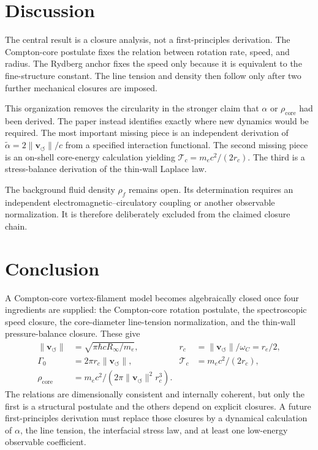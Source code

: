 \documentclass[aps,pra,preprint,longbibliography,nofootinbib]{revtex4-2}
\newcommand{\vnorm}{\lVert\mathbf{v}_{\!\boldsymbol{\circlearrowleft}}\rVert} %
\newcommand{\rhof}{\rho_{\!f}}                   %
\newcommand{\rhocore}{\rho_{\mathrm{core}}}      %
\newcommand{\rc}{r_c}                            %
\newcommand{\Tc}{\mathcal{T}_c}                  %
\newcommand{\Gz}{\Gamma_0}                       %
\begin{document}
\section{Discussion}
\label{sec:discussion}

The central result is a closure analysis, not a first-principles
derivation.  The Compton-core postulate fixes the relation between
rotation rate, speed, and radius.  The Rydberg anchor fixes the speed
only because it is equivalent to the fine-structure constant.  The line
tension and density then follow only after two further mechanical
closures are imposed.

This organization removes the circularity in the stronger claim that
$\alpha$ or $\rho_{\mathrm{core}}$ had been derived.  The paper instead
identifies exactly where new dynamics would be required.  The most
important missing piece is an independent derivation of
$\tilde\alpha=2\vnorm/c$ from a specified interaction functional.  The
second missing piece is an on-shell core-energy calculation yielding
$\mathcal{T}_c=m_ec^2/(2r_c)$.  The third is a stress-balance derivation
of the thin-wall Laplace law.

The background fluid density $\rhof$ remains open.  Its determination
requires an independent electromagnetic--circulatory coupling or another
observable normalization.  It is therefore deliberately excluded from
the claimed closure chain.

\section{Conclusion}
\label{sec:conclusion}

A Compton-core vortex-filament model becomes algebraically closed once
four ingredients are supplied: the Compton-core rotation postulate, the
spectroscopic speed closure, the core-diameter line-tension
normalization, and the thin-wall pressure-balance closure.  These give
\begin{align*}
  \vnorm  &= \sqrt{\pi\hbar cR_\infty/m_e},
  &\rc    &= \vnorm/\omega_C = r_e/2, \\
  \Gz     &= 2\pi\rc\vnorm,
  &\Tc    &= m_ec^2/(2\rc),\\
  \rhocore &= m_ec^2/(2\pi\vnorm^2\rc^3).
\end{align*}
The relations are dimensionally consistent and internally coherent, but
only the first is a structural postulate and the others depend on
explicit closures.  A future first-principles derivation must replace
those closures by a dynamical calculation of $\alpha$, the line tension,
the interfacial stress law, and at least one low-energy observable
coefficient.
\end{document}
